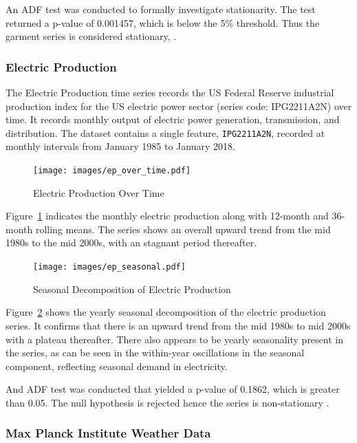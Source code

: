 \documentclass[conference]{IEEEtran}
\begin{document}
An ADF test was conducted to formally investigate stationarity. The test returned a p-value of 0.001457, which is below the 5\% threshold. Thus the garment series is considered stationary, \cite{garment_productivty}.

\subsubsection{\textbf{Electric Production}}

The Electric Production time series records the US Federal Reserve industrial production index for the US electric power sector (series code: IPG2211A2N) over time. It records monthly output of electric power generation, transmission, and distribution. The dataset contains a single feature, \texttt{IPG2211A2N}, recorded at monthly intervals from January 1985 to January 2018.

\begin{figure}[H]
    \centering
    \texttt{[image: images/ep\_over\_time.pdf]}
    \caption{Electric Production Over Time}
    \label{fig:ep_over_time}
\end{figure}

Figure~\ref{fig:ep_over_time} indicates the monthly electric production along with 12-month and 36-month rolling means. The series shows an overall upward trend from the mid 1980s to the mid 2000s, with an stagnant period thereafter.

\begin{figure}[H]
    \centering
    \texttt{[image: images/ep\_seasonal.pdf]}
    \caption{Seasonal Decomposition of Electric Production}
    \label{fig:ep_seasonal}
\end{figure}

Figure~\ref{fig:ep_seasonal} shows the yearly seasonal decomposition of the electric production series. It confirms that there is an upward trend from the mid 1980s to mid 2000s with a plateau thereafter. There also appears to be yearly seasonality present in the series, as can be seen in the within-year oscillations in the seasonal component, reflecting seasonal demand in electricity.

And ADF test was conducted that yielded a p-value of 0.1862, which is greater than 0.05. The null hypothesis is rejected hence the series is non-stationary \cite{electric_production}.

\subsubsection{\textbf{Max Planck Institute Weather Data}}
\end{document}
